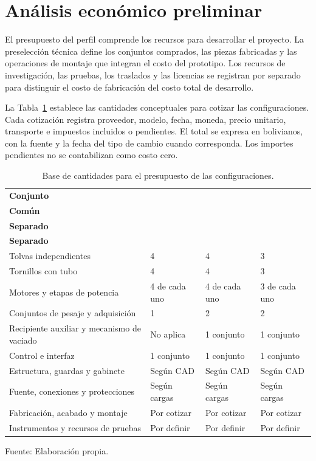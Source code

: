 \section{Análisis económico preliminar}
\label{sec:presupuesto_preliminar}

El presupuesto del perfil comprende los recursos para desarrollar el
proyecto. La preselección técnica define los conjuntos comprados, las
piezas fabricadas y las operaciones de montaje que integran el costo
del prototipo. Los recursos de investigación, las pruebas, los traslados
y las licencias se registran por separado para distinguir el costo de
fabricación del costo total de desarrollo.

La Tabla~\ref{tab:base_presupuesto} establece las cantidades conceptuales
para cotizar las configuraciones. Cada cotización registra proveedor,
modelo, fecha, moneda, precio unitario, transporte e impuestos incluidos
o pendientes. El total se expresa en bolivianos, con la fuente y la
fecha del tipo de cambio cuando corresponda. Los importes pendientes
no se contabilizan como costo cero.

\begin{table}[H]
    \centering
    \caption{Base de cantidades para el presupuesto de las configuraciones.}
    \label{tab:base_presupuesto}
    \footnotesize
    \renewcommand{\arraystretch}{1.15}
    \begin{tabularx}{\textwidth}{p{}XXX}
        \toprule
        \textbf{Conjunto} & \makecell[l]{\textbf{Cuatro}\\\textbf{Común}} & \makecell[l]{\textbf{Cuatro}\\\textbf{Separado}} & \makecell[l]{\textbf{Tres}\\\textbf{Separado}} \\
        \midrule
        Tolvas independientes & 4 & 4 & 3 \\
        Tornillos con tubo & 4 & 4 & 3 \\
        Motores y etapas de potencia & 4 de cada uno & 4 de cada uno & 3 de cada uno \\
        Conjuntos de pesaje y adquisición & 1 & 2 & 2 \\
        Recipiente auxiliar y mecanismo de vaciado & No aplica & 1 conjunto & 1 conjunto \\
        Control e interfaz & 1 conjunto & 1 conjunto & 1 conjunto \\
        Estructura, guardas y gabinete & Según CAD & Según CAD & Según CAD \\
        Fuente, conexiones y protecciones & Según cargas & Según cargas & Según cargas \\
        Fabricación, acabado y montaje & Por cotizar & Por cotizar & Por cotizar \\
        Instrumentos y recursos de pruebas & Por definir & Por definir & Por definir \\
        \bottomrule
    \end{tabularx}
    \par\smallskip
    Fuente: Elaboración propia.
\end{table}

